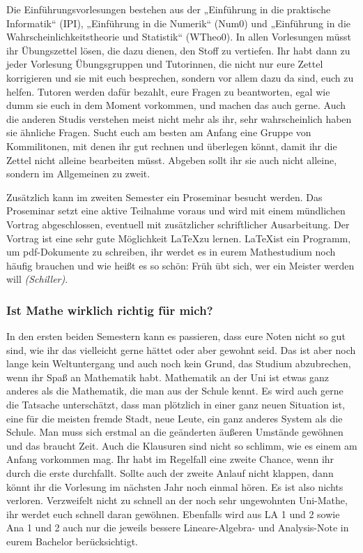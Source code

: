 Die Einführungsvorlesungen bestehen aus der „Einführung in die praktische Informatik“ (\gls{IPI}), „Einführung in die Numerik“ (\gls{Num0}) und „Einführung in die Wahrscheinlichkeitstheorie und Statistik“ (\gls{WTheo0}). In allen Vorlesungen müsst ihr Übungszettel lösen, die dazu dienen, den Stoff zu vertiefen. Ihr habt dann zu jeder Vorlesung Übungsgruppen und Tutorinnen, die nicht nur eure Zettel korrigieren und sie mit euch besprechen, sondern vor allem dazu da sind, euch zu helfen. Tutoren werden dafür bezahlt, eure Fragen zu beantworten, egal wie dumm sie euch in dem Moment vorkommen, und machen das auch gerne. Auch die anderen Studis verstehen meist nicht mehr als ihr, sehr wahrscheinlich haben sie ähnliche Fragen. Sucht euch am besten am Anfang eine Gruppe von Kommilitonen, mit denen ihr gut rechnen und überlegen könnt, damit ihr die Zettel nicht alleine bearbeiten müsst. Abgeben sollt ihr sie auch nicht alleine, sondern im Allgemeinen zu zweit.

Zusätzlich kann im zweiten Semester ein Proseminar besucht werden. Das Proseminar setzt eine aktive Teilnahme voraus und wird mit einem mündlichen Vortrag abgeschlossen, eventuell mit zusätzlicher schriftlicher Ausarbeitung. Der Vortrag ist eine sehr gute Möglichkeit \LaTeX zu lernen. \LaTeX ist ein Programm, um pdf-Dokumente zu schreiben, ihr werdet es in eurem Mathestudium noch häufig brauchen und wie heißt es so schön: Früh übt sich, wer ein Meister werden will \textit{(Schiller)}.

\subsubsection{Ist Mathe wirklich richtig für mich?}

In den ersten beiden Semestern kann es passieren, dass eure Noten nicht so gut sind, wie ihr das vielleicht gerne hättet oder aber gewohnt seid. Das ist aber noch lange kein Weltuntergang und auch noch kein Grund, das Studium abzubrechen, wenn ihr Spaß an Mathematik habt. Mathematik an der Uni ist etwas ganz anderes als die Mathematik, die man aus der Schule kennt. Es wird auch gerne die Tatsache unterschätzt, dass man plötzlich in einer ganz neuen Situation ist, eine für die meisten fremde Stadt, neue Leute, ein ganz anderes System als die Schule. Man muss sich erstmal an die geänderten äußeren Umstände gewöhnen und das braucht Zeit. Auch die Klausuren sind nicht so schlimm, wie es einem am Anfang vorkommen mag. Ihr habt im Regelfall eine zweite Chance, wenn ihr durch die erste durchfallt. Sollte auch der zweite Anlauf nicht klappen, dann könnt ihr die Vorlesung im nächsten Jahr noch einmal hören. Es ist also nichts verloren. Verzweifelt nicht zu schnell an der noch sehr ungewohnten Uni-Mathe, ihr werdet euch schnell daran gewöhnen. Ebenfalls wird aus LA 1 und 2 sowie Ana 1 und 2 auch nur die jeweils bessere Lineare-Algebra- und Analysis-Note in eurem Bachelor berücksichtigt.

